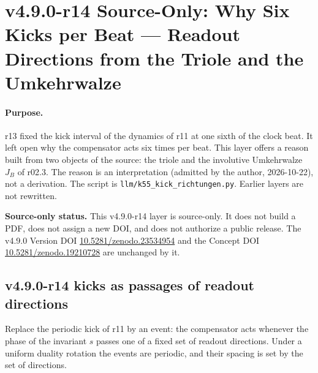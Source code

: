 \clearpage
\section*{v4.9.0-r14 Source-Only: Why Six Kicks per Beat --- Readout Directions from the Triole and the Umkehrwalze}
\label{sec:v490-r14-readout-directions}

\paragraph{Purpose.}
r13 fixed the kick interval of the dynamics of r11 at one sixth of the clock beat.  It left open why the compensator acts
six times per beat.  This layer offers a reason built from two objects of the source: the triole and the involutive
Umkehrwalze \(J_B\) of r02.3.  The reason is an interpretation (admitted by the author, 2026-10-22), not a derivation.  The
script is \texttt{llm/k55\_kick\_richtungen.py}.  Earlier layers are not rewritten.

\noindent\textbf{Source-only status.}
This v4.9.0-r14 layer is source-only.  It does not build a PDF, does not assign a new DOI,
and does not authorize a public release.  The v4.9.0 Version DOI
\href{https://doi.org/10.5281/zenodo.23534954}{10.5281/zenodo.23534954} and the Concept DOI
\href{https://doi.org/10.5281/zenodo.19210728}{10.5281/zenodo.19210728} are unchanged by it.

\subsection*{v4.9.0-r14 kicks as passages of readout directions}
\label{subsec:v490-r14-passages}

Replace the periodic kick of r11 by an event: the compensator acts whenever the phase of the invariant \(s\) passes one of a
fixed set of readout directions.  Under a uniform duality rotation the events are periodic, and their spacing is set by the
set of directions.

